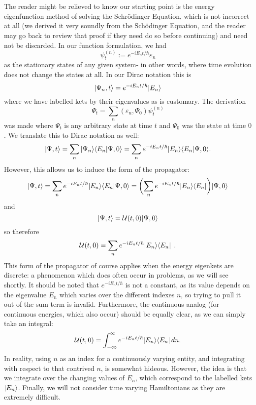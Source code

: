 \\\\
The reader might be relieved to know our starting point is the energy eigenfunction method of solving the Schr\"{o}dinger Equation, which is not incorrect at all (we derived it very soundly from the Sch\"{o}dinger Equation, and the reader may go back to review that proof if they need do so before continuing) and need not be discarded. In our function formulation, we had 
$$
\psi_{t}^{(n)}:=e^{-iE_{n}t/\hbar}\varepsilon_{n}
$$
as the stationary states of any given system- in other words, where time evolution does not change the states at all. In our Dirac notation this is
$$
|\Psi_{n},t\rangle=e^{-iE_{n}t/\hbar}|E_{n}\rangle
$$
where we have labelled kets by their eigenvalues as is customary. The derivation 
$$
\Psi_{t}=\sum_{n}(\varepsilon_{n},\Psi_{0})\psi_{t}^{(n)}
$$
was made where $\Psi_{t}$ is any arbitrary state at time $t$ and $\Psi_{0}$ was the state at time $0$. We translate this to Dirac notation as well:
$$
|\Psi, t\rangle=\sum_{n}|\Psi_{n}\rangle\langle E_{n}|\Psi,0\rangle=\sum_{n}e^{-iE_{n}t/\hbar}|E_{n}\rangle\langle E_{n}|\Psi,0\rangle.
$$
However, this allows us to induce the form of the propagator:
$$
|\Psi, t\rangle=\sum_{n}e^{-iE_{n}t/\hbar}|E_{n}\rangle\langle E_{n}|\Psi,0\rangle=\biggl(\sum_{n}e^{-iE_{n}t/\hbar}|E_{n}\rangle\langle E_{n}|\biggr)|\Psi,0\rangle
$$
and 
$$
|\Psi,t\rangle=\mathcal{U}(t,0)|\Psi,0\rangle
$$
so therefore
$$
\mathcal{U}(t,0)=\sum_{n}e^{-iE_{n}t/\hbar}|E_{n}\rangle\langle E_{n}|\:\:.
$$
This form of the propagator of course applies when the energy eigenkets are discrete: a phenomenon which does often occur in problems, as we will see shortly. It should be noted that $e^{-iE_{n}t/\hbar}$ is not a constant, as its value depends on the eigenvalue $E_{n}$ which varies over the different indexes $n$, so trying to pull it out of the sum term is invalid. Furthermore, the continuous analog (for continuous energies, which also occur) should be equally clear, as we can simply take an integral:
$$
\mathcal{U}(t,0)=\int_{-\infty}^{\infty} e^{-iE_{n}t/\hbar}|E_{n}\rangle\langle E_{n}|\,dn.
$$
In reality, using $n$ as an index for a continuously varying entity, and integrating with respect to that contrived $n$, is somewhat hideous. However, the idea is that we integrate over the changing values of $E_{n}$, which correspond to the labelled kets $|E_{n}\rangle$. Finally, we will not consider time varying Hamiltonians as they are extremely difficult.

